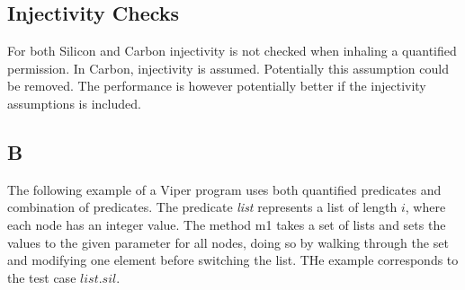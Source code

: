 \documentclass[12pt]{article}
\begin{document}
\subsection{Injectivity Checks}
For both Silicon and Carbon injectivity is not checked when inhaling a quantified permission. In Carbon, injectivity is assumed. Potentially this assumption could be removed. The performance is however potentially better if the injectivity assumptions is included.

\subsection{B}
The following example of a Viper program uses both quantified predicates and combination of predicates. The predicate \textit{list} represents a list of length \(i\), where each node has an integer value. The method m1 takes a set of lists and sets the values to the given parameter for all nodes, doing so by walking through the set and modifying one element before switching the list. THe example corresponds to the test case \(list.sil\).
\end{document}
